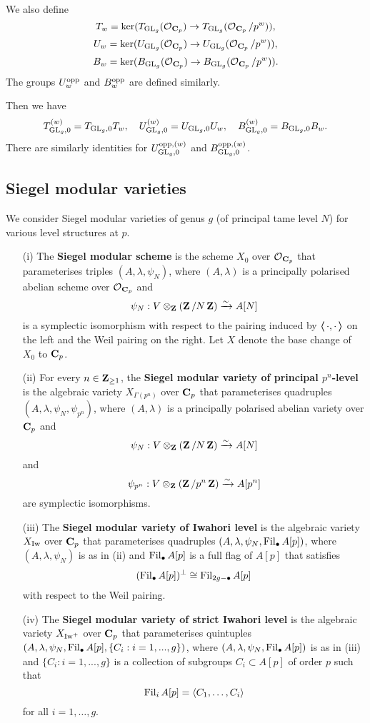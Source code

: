 \begin{enumerate}
We also define
$$T_w=\ker(T_{\operatorname{GL}_g}(\operatorname{\mathcal{O}}_{\operatorname{\mathbf{C}}_p})\rightarrow T_{\operatorname{GL}_g}(\operatorname{\mathcal{O}}_{\operatorname{\mathbf{C}}_p}/p^w)),$$
$$U_w=\ker(U_{\operatorname{GL}_g}(\operatorname{\mathcal{O}}_{\operatorname{\mathbf{C}}_p})\rightarrow U_{\operatorname{GL}_g}(\operatorname{\mathcal{O}}_{\operatorname{\mathbf{C}}_p}/p^w)),$$
$$B_w=\ker(B_{\operatorname{GL}_g}(\operatorname{\mathcal{O}}_{\operatorname{\mathbf{C}}_p})\rightarrow B_{\operatorname{GL}_g}(\operatorname{\mathcal{O}}_{\operatorname{\mathbf{C}}_p}/p^w)).$$
The groups $U_w^{\operatorname{opp}}$ and $B_w^{\operatorname{opp}}$ are defined similarly.

Then we have 
$$T_{\operatorname{GL}_g,0}^{(w)}=T_{\operatorname{GL}_g,0}T_w,\quad U_{\operatorname{GL}_g,0}^{(w)}=U_{\operatorname{GL}_g,0}U_w,\quad B_{\operatorname{GL}_g,0}^{(w)}=B_{\operatorname{GL}_g,0}B_w.$$
There are similarly identities for $U_{\operatorname{GL}_g,0}^{\operatorname{opp}, (w)}$ and $B_{\operatorname{GL}_g,0}^{\operatorname{opp}, (w)}$.
\end{enumerate}


\subsection{Siegel modular varieties}\label{subsection: Siegel modular varieties} 
We consider Siegel modular varieties of genus $g$ (of principal tame level $N$) for various level structures at $p$.
\begin{Definition}\label{Definition: Siegel modular varieties of (strict) Iwahoris level}
\begin{enumerate}
\item[(i)] The \textbf{Siegel modular scheme} is the scheme $X_0$ over $\operatorname{\mathcal{O}}_{\operatorname{\mathbf{C}}_p}$ that parameterises triples $(A, \lambda, \psi_N)$, where $(A, \lambda)$ is a principally polarised abelian scheme over $\operatorname{\mathcal{O}}_{\operatorname{\mathbf{C}}_p}$ and $$\psi_N: V\otimes_{\operatorname{\mathbf{Z}}}(\operatorname{\mathbf{Z}}/N\operatorname{\mathbf{Z}})\xrightarrow[]{\sim} A[N]$$ 
is a symplectic isomorphism with respect to the pairing induced by $\operatorname{\boldsymbol{\langle}}\cdot, \cdot\operatorname{\boldsymbol{\rangle}}$ on the left and the Weil pairing on the right. Let $X$ denote the base change of $X_0$ to $\operatorname{\mathbf{C}}_p$.
\item[(ii)] For every $n\in \operatorname{\mathbf{Z}}_{\geq 1}$, the \textbf{Siegel modular variety of principal $p^n$-level} is the algebraic variety $X_{\Gamma(p^n)}$ over $\operatorname{\mathbf{C}}_p$ that parameterises quadruples $(A, \lambda, \psi_N, \psi_{p^n})$, where $(A, \lambda)$ is a principally polarised abelian variety over $\operatorname{\mathbf{C}}_p$ and $$\psi_N: V\otimes_{\operatorname{\mathbf{Z}}}(\operatorname{\mathbf{Z}}/N\operatorname{\mathbf{Z}})\xrightarrow[]{\sim} A[N]$$ 
and
$$\psi_{p^n}:V\otimes_{\operatorname{\mathbf{Z}}}(\operatorname{\mathbf{Z}}/p^n\operatorname{\mathbf{Z}})\xrightarrow[]{\sim} A[p^n]$$
are symplectic isomorphisms.
 \item[(iii)] The \textbf{Siegel modular variety of Iwahori level} is the algebraic variety $X_{\operatorname{Iw}}$ over $\operatorname{\mathbf{C}}_p$ that parameterises quadruples $(A, \lambda, \psi_N, \operatorname{Fil}_{\bullet}A[p])$, where $(A, \lambda, \psi_N)$ is as in (ii) and $\operatorname{Fil}_{\bullet}A[p]$ is a full flag of $A[p]$ that satisfies $$(\operatorname{Fil}_{\bullet}A[p])^{\perp}\cong \operatorname{Fil}_{2g-\bullet}A[p]$$ with respect to the Weil pairing.
    \item[(iv)] The \textbf{Siegel modular variety of strict Iwahori level} is the algebraic variety $X_{\operatorname{Iw}^+}$ over $\operatorname{\mathbf{C}}_p$ that parameterises quintuples $(A, \lambda, \psi_N, \operatorname{Fil}_{\bullet}A[p], \{C_i:i=1, ..., g\})$, where $(A, \lambda, \psi_N, \operatorname{Fil}_{\bullet}A[p])$ is as in (iii) and $\{C_i: i=1, ..., g\}$ is a collection of subgroups $C_i\subset A[p]$ of order $p$ such that $$\operatorname{Fil}_iA[p]=\langle C_1, \ldots, C_i\rangle$$
for all $i=1, \ldots, g$.
\end{enumerate}
\end{Definition}

